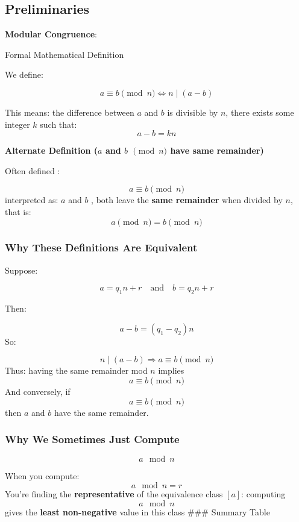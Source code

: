 \documentclass[]{article}
\begin{document}
\subsection{Preliminaries}\label{preliminaries}

\textbf{Modular Congruence}:

Formal Mathematical Definition

We define:

\[a \equiv b \pmod{n} \iff n \mid (a - b)\]

This means: the difference between \(a\) and \(b\) is divisible by
\(n\), there exists some integer \(k\) such that: \[ a - b = kn\]

\textbf{Alternate Definition (\(a\) and \(b\) \(\pmod n\) have same
remainder)}

Often defined :

\[a \equiv b \pmod{n}\] interpreted as: \(a\) and \(b\) , both leave the
\textbf{same remainder} when divided by \(n\), that is: \[
a \pmod{n} = b \pmod{n}
\]

\subsubsection{Why These Definitions Are
Equivalent}\label{why-these-definitions-are-equivalent}

Suppose:

\[a = q_1 n + r \quad \text{and} \quad b = q_2 n + r\]

Then:

\[a - b = (q_1 - q_2)n\] So:

\[n \mid (a - b) \Rightarrow a \equiv b \pmod{n}\] Thus: having the same
remainder mod \(n\) implies \[a \equiv b \pmod{n}\] And conversely, if
\[a \equiv b \pmod{n}\]then \(a\) and \(b\) have the same remainder.

\subsubsection{Why We Sometimes Just
Compute}\label{why-we-sometimes-just-compute}

\[a \mod n\]

When you compute: \[a \mod n = r\] You're finding the
\textbf{representative} of the equivalence class \([a]\): computing
\[a \mod n\]gives the \textbf{least non-negative} value in this class
\#\#\# Summary Table
\end{document}
